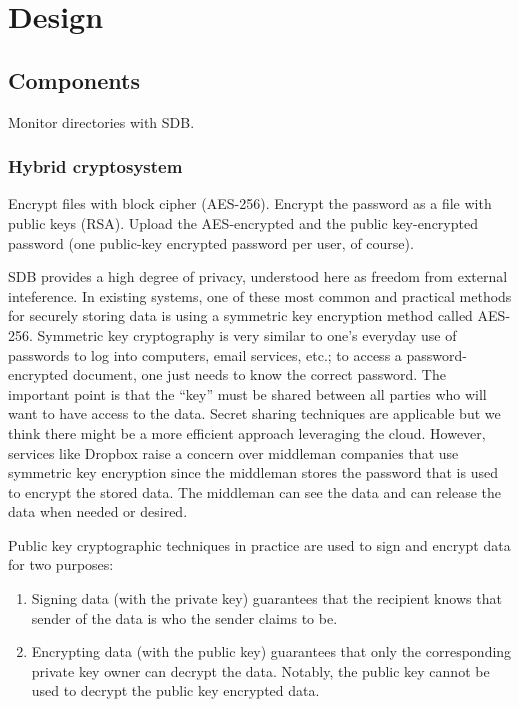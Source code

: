 \section{Design}

\subsection{Components}

Monitor directories with SDB.

\subsubsection*{Hybrid cryptosystem}
Encrypt files with block cipher (AES-256). Encrypt the password as a
file with public keys (RSA).  Upload the AES-encrypted and the public
key-encrypted password (one public-key encrypted password per user, of
course).

SDB provides a high degree of privacy, understood here as freedom from
external inteference. In existing systems, one of these most common
and practical methods for securely storing data is using a symmetric
key encryption method called AES-256. Symmetric key cryptography is
very similar to one's everyday use of passwords to log into computers,
email services, etc.; to access a password-encrypted document, one
just needs to know the correct password. The important point is that
the ``key'' must be shared between all parties who will want to have
access to the data. Secret sharing techniques are applicable but we
think there might be a more efficient approach leveraging the
cloud. However, services like Dropbox raise a concern over middleman
companies that use symmetric key encryption since the middleman stores
the password that is used to encrypt the stored data. The middleman
can see the data and can release the data when needed or desired.

Public key cryptographic techniques in practice are used to sign and
encrypt data for two purposes: 
\begin{enumerate}
\item Signing data (with the private key) guarantees that the
  recipient knows that sender of the data is who the sender claims to
  be.
\item Encrypting data (with the public key) guarantees that only the
  corresponding private key owner can decrypt the data. Notably, the
  public key cannot be used to decrypt the public key encrypted data.
\end{enumerate}

